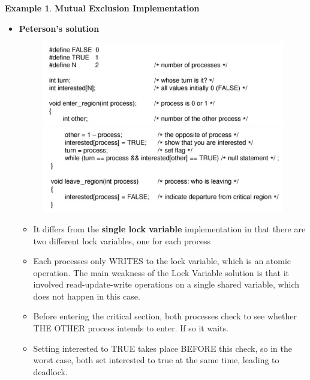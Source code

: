 \documentclass[11pt,a4paper]{article}
\theoremstyle{definition}
\newtheorem{example}{Example}[section]
\newenvironment{myitemize}
{ \begin{itemize}
    \setlength{\itemsep}{5pt}
    \setlength{\parskip}{0pt}
    \setlength{\parsep}{0pt}     }
{ \end{itemize}                  }
\begin{document}
\begin{example}{\textbf{Mutual Exclusion Implementation}}
\begin{myitemize}
\begin{myitemize}
\begin{myitemize}
			\end{myitemize}
			\item \textbf{Peterson's solution}
			\begin{figure}[!h]
				\includegraphics[scale=0.45]{m1/peterson1}
				\includegraphics[scale=0.45]{m1/peterson2}
			\end{figure}
			\begin{myitemize}
				\item It differs from the \textbf{single lock variable} implementation in that there are two different lock variables, one for each process
				\item Each processes only WRITES to the lock variable, which is an atomic operation. The main weakness of the Lock Variable solution is that it involved read-update-write operations on a single shared variable, which does not happen in this case.
				\item Before entering the critical section, both processes check to see whether THE OTHER process intends to enter. If so it waits.
				\item Setting interested to TRUE takes place BEFORE this check, so in the worst case, both set interested to true at the same time, leading to deadlock. 
			\end{myitemize}


\end{myitemize}
\end{myitemize}
\end{example}
\end{document}
